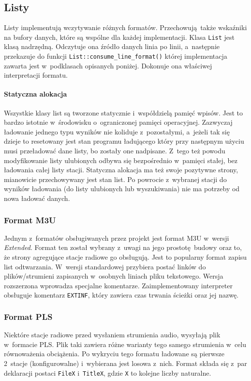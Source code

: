 \documentclass[polish]{aghengthesis}
\begin{document}
		\subsection{Listy}
			Listy implementują wczytywanie różnych formatów. Przechowują także wskaźniki na bufory danych, które są wspólne dla każdej implementacji. Klasa \lstinline|List| jest klasą nadrzędną. Odczytuje ona źródło danych linia po linii, a~następnie przekazuje do funkcji \lstinline|List::consume_line_format()| której implementacja zawarta jest w~podklasach opisanych poniżej. Dokonuje ona właściwej interpretacji formatu.
			
			\paragraph{Statyczna alokacja} Wszystkie klasy list są tworzone statycznie i~współdzielą pamięć wpisów. Jest to bardzo istotnie w~środowisku o~ograniczonej pamięci operacyjnej. Zazwyczaj ładowanie jednego typu wyników nie koliduje z~pozostałymi, a~jeżeli tak się dzieje to resetowany jest stan programu ładującego który przy następnym użyciu musi przeładować dane listy, bo zostały one nadpisane. Z~tego też powodu modyfikowanie listy ulubionych odbywa się bezpośrednio w~pamięci stałej, bez ładowania całej listy stacji. Statyczna alokacja ma też swoje pozytywne strony, mianowicie przechowywany jest stan list. Po powrocie z~wybranej stacji do wyników ładowania (do listy ulubionych lub wyszukiwania) nie ma potrzeby od nowa ładować danych.
			
			\subsubsection{Format M3U}
				Jednym z~formatów obsługiwanych przez projekt jest format M3U\textsuperscript{\cite{m3u}} w~wersji \textit{Extended}. Format ten został wybrany z~uwagi na jego prostotę budowy oraz to, że strony agregujące stacje radiowe go obsługują. Jest to popularny format zapisu list odtwarzania. W~wersji standardowej przybiera postać linków do plików/strumieni zapisanych w~osobnych liniach pliku tekstowego. Wersja rozszerzona wprowadza specjalne komentarze. Zaimplementowany interpreter obsługuje komentarz \lstinline|EXTINF|, który zawiera czas trwania ścieżki oraz jej nazwę.
			
			\subsubsection{Format PLS}
				Niektóre stacje radiowe przed wysłaniem strumienia audio, wysyłają plik w~formacie PLS\textsuperscript{\cite{pls}}. Plik taki zawiera różne warianty tego samego strumienia w~celu równoważenia obciążenia. Po wykryciu tego formatu ładowane są pierwsze 2~stacje (konfigurowalne) i~wybierana jest losowa z~nich. Format składa się z~par deklaracji postaci \lstinline|FileX| i~\lstinline|TitleX|, gdzie \lstinline|X| to kolejne liczby naturalne.
			
\end{document}
